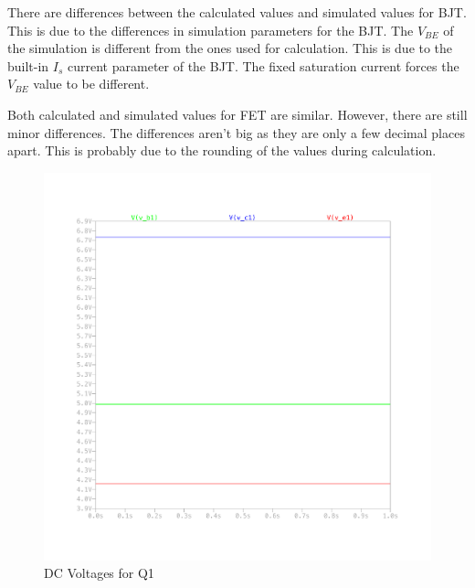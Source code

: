 \documentclass{article}
\begin{document}
There are differences between the calculated values and simulated values for BJT.
This is due to the differences in simulation parameters for the BJT.
The $V_{BE}$ of the simulation is different from the ones used for calculation.
This is due to the built-in $I_{s}$ current parameter of the BJT.
The fixed saturation current forces the $V_{BE}$ value to be different.

Both calculated and simulated values for FET are similar.
However, there are still minor differences.
The differences aren't big as they are only a few decimal places apart.
This is probably due to the rounding of the values during calculation.

\begin{figure}[H]
    \centering
    \includegraphics[height=0.4\textheight,trim={30mm 30mm 30mm 30mm}]{img/Amplifier Design Q1 V.pdf}
    \caption{DC Voltages for Q1}
    \label{fig:dc-v-q1}
\end{figure}
\end{document}
